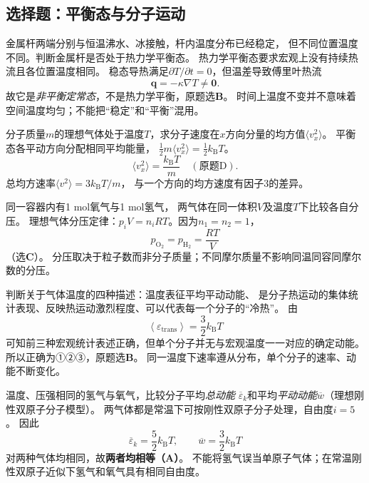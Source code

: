 \subsection{选择题：平衡态与分子运动}

\problemtext 金属杆两端分别与恒温沸水、冰接触，杆内温度分布已经稳定，
但不同位置温度不同。判断金属杆是否处于热力学平衡态。
\workings
热力学平衡态要求宏观上没有持续热流且各位置温度相同。
稳态导热满足$\partial T/\partial t=0$，但温差导致傅里叶热流
\[
\bm q=-\kappa\nabla T\ne\bm 0.
\]
故它是\emph{非平衡定常态}，不是热力学平衡，原题选\textbf{B}。
\crosscheck 时间上温度不变并不意味着空间温度均匀；不能把“稳定”和“平衡”混用。

\problemtext 分子质量$m$的理想气体处于温度$T$，求分子速度在$x$方向分量的均方值$\langle v_x^2\rangle$。
\workings
平衡态各平动方向分配相同平均能量，
$\frac12m\langle v_x^2\rangle=\frac12k_{\mathrm B}T$。
\[
\boxed{\langle v_x^2\rangle=\frac{k_{\mathrm B}T}{m}}\quad(\text{原题D}).
\]
\crosscheck 总均方速率$\langle v^2\rangle=3k_{\mathrm B}T/m$，
与一个方向的均方速度有因子3的差异。

\problemtext 同一容器内有1 mol氧气与1 mol氢气，
两气体在同一体积$V$及温度$T$下比较各自分压。
\workings
理想气体分压定律：$p_iV=n_iRT$。因为$n_1=n_2=1$，
\[
\boxed{p_{\mathrm{O_2}}=p_{\mathrm{H_2}}=\frac{RT}{V}}
\]
（选\textbf{C}）。
\crosscheck 分压取决于粒子数而非分子质量；不同摩尔质量不影响同温同容同摩尔数的分压。

\problemtext 判断关于气体温度的四种描述：温度表征平均平动动能、
是分子热运动的集体统计表现、反映热运动激烈程度、可以代表每一个分子的“冷热”。
\workings
由
\[
\left\langle \varepsilon_{\mathrm{trans}}\right\rangle
=\frac32k_{\mathrm B}T
\]
可知前三种宏观统计表述正确，但单个分子并无与宏观温度一一对应的确定动能。
所以正确为①②③，原题选\textbf{B}。
\crosscheck 同一温度下速率遵从分布，单个分子的速率、动能不断变化。

\problemtext 温度、压强相同的氢气与氧气，比较分子平均\emph{总动能}
$\overline\varepsilon_k$和平均\emph{平动动能}$\overline w$（理想刚性双原子分子模型）。
\workings
两气体都是常温下可按刚性双原子分子处理，自由度$i=5$。
因此
\[
\overline\varepsilon_k=\frac52k_{\mathrm B}T,\qquad
\overline w=\frac32k_{\mathrm B}T
\]
对两种气体均相同，故\textbf{两者均相等（A）}。
\crosscheck 不能将氢气误当单原子气体；在常温刚性双原子近似下氢气和氧气具有相同自由度。

